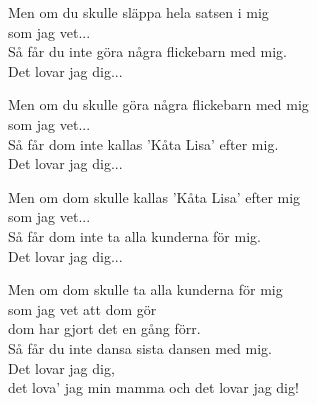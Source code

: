 Men om du skulle släppa hela satsen i mig\\
som jag vet...\\
Så får du inte göra några flickebarn med mig.\\
Det lovar jag dig...\par
\vspace{10pt}
Men om du skulle göra några flickebarn med mig\\
som jag vet...\\
Så får dom inte kallas 'Kåta Lisa' efter mig.\\
Det lovar jag dig...\par
\vspace{10pt}
Men om dom skulle kallas 'Kåta Lisa' efter mig\\
som jag vet...\\
Så får dom inte ta alla kunderna för mig.\\
Det lovar jag dig...\par
\vspace{10pt}
Men om dom skulle ta alla kunderna för mig\\
som jag vet att dom gör\\
dom har gjort det en gång förr.\\
Så får du inte dansa sista dansen med mig.\\
Det lovar jag dig,\\
det lova' jag min mamma och det lovar jag dig!
